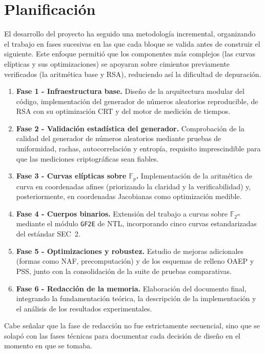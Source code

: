 \section{Planificación}
El desarrollo del proyecto ha seguido una metodología incremental, organizando el trabajo en fases sucesivas en las que cada bloque se valida antes de construir el siguiente. Este enfoque permitió que los componentes más complejos (las curvas elípticas y sus optimizaciones) se apoyaran sobre cimientos previamente verificados (la aritmética base y RSA), reduciendo así la dificultad de depuración.

\begin{enumerate}
  \item \textbf{Fase 1 - Infraestructura base.} Diseño de la arquitectura modular del código, implementación del generador de números aleatorios reproducible, de RSA con su optimización CRT y del motor de medición de tiempos.
  \item \textbf{Fase 2 - Validación estadística del generador.} Comprobación de la calidad del generador de números aleatorios mediante pruebas de uniformidad, rachas, autocorrelación y entropía, requisito imprescindible para que las mediciones criptográficas sean fiables.
  \item \textbf{Fase 3 - Curvas elípticas sobre $\mathbb{F}_p$.} Implementación de la aritmética de curva en coordenadas afines (priorizando la claridad y la verificabilidad) y, posteriormente, en coordenadas Jacobianas como optimización medible.
  \item \textbf{Fase 4 - Cuerpos binarios.} Extensión del trabajo a curvas sobre $\mathbb{F}_{2^m}$ mediante el módulo \texttt{GF2E} de NTL, incorporando cinco curvas estandarizadas del estándar SEC~2.
  \item \textbf{Fase 5 - Optimizaciones y robustez.} Estudio de mejoras adicionales (formas como NAF, precomputación) y de los esquemas de relleno OAEP y PSS, junto con la consolidación de la suite de pruebas comparativas.
  \item \textbf{Fase 6 - Redacción de la memoria.} Elaboración del documento final, integrando la fundamentación teórica, la descripción de la implementación y el análisis de los resultados experimentales.
\end{enumerate}

Cabe señalar que la fase de redacción no fue estrictamente secuencial, sino que se solapó con las fases técnicas para documentar cada decisión de diseño en el momento en que se tomaba.

